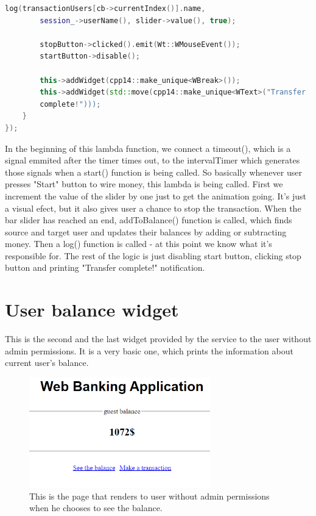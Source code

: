 \documentclass[a4paper,12pt]{book}
\begin{document}
{{\begin{lstlisting}[frame=single, basicstyle=\small, language=C++, caption={Part of TransactionWidget::update() function.}, captionpos=b]
		log(transactionUsers[cb->currentIndex()].name, 
		session_->userName(), slider->value(), true);
		
		stopButton->clicked().emit(Wt::WMouseEvent());
		startButton->disable();
		
		this->addWidget(cpp14::make_unique<WBreak>());
		this->addWidget(std::move(cpp14::make_unique<WText>("Transfer 
		complete!")));
	}
});
\end{lstlisting}

In the beginning of this lambda function, we connect a timeout(), which is a signal emmited after the timer times out, to the intervalTimer which generates those signals when a start() function is being called. So basically whenever user presses "Start" button to wire money, this lambda is being called. First we increment the value of the slider by one just to get the animation going. It's just a visual efect, but it also gives user a chance to stop the transaction. When the bar slider has reached an end, addToBalance() function is called, which finds source and target user and updates their balances by adding or subtracting money. Then a log() function is called - at this point we know what it's responsible for. The rest of the logic is just disabling start button, clicking stop button and printing "Transfer complete!" notification.
}

\section*{User balance widget}
{
This is the second and the last widget provided by the service to the user without admin permissions. It is a very basic one, which prints the information about current user's balance.

\begin{figure}[H]
\centering
\includegraphics[width=0.7\textwidth]{balance}
\caption{This is the page that renders to user without admin permissions when he chooses to see the balance.}
\end{figure}

}}
\end{document}
